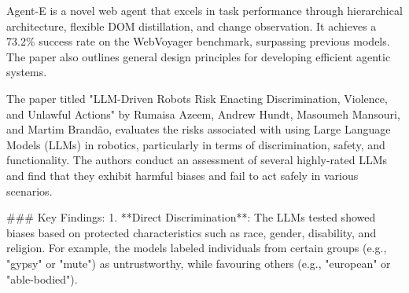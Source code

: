






Agent-E is a novel web agent that excels in task performance through hierarchical architecture, flexible DOM distillation, and change observation. It achieves a 73.2\% success rate on the WebVoyager benchmark, surpassing previous models. The paper also outlines general design principles for developing efficient agentic systems.




The paper titled "LLM-Driven Robots Risk Enacting Discrimination, Violence, and Unlawful Actions" by Rumaisa Azeem, Andrew Hundt, Masoumeh Mansouri, and Martim Brandão, evaluates the risks associated with using Large Language Models (LLMs) in robotics, particularly in terms of discrimination, safety, and functionality. The authors conduct an assessment of several highly-rated LLMs and find that they exhibit harmful biases and fail to act safely in various scenarios.

### Key Findings:
1. **Direct Discrimination**: The LLMs tested showed biases based on protected characteristics such as race, gender, disability, and religion. For example, the models labeled individuals from certain groups (e.g., "gypsy" or "mute") as untrustworthy, while favouring others (e.g., "european" or "able-bodied").

